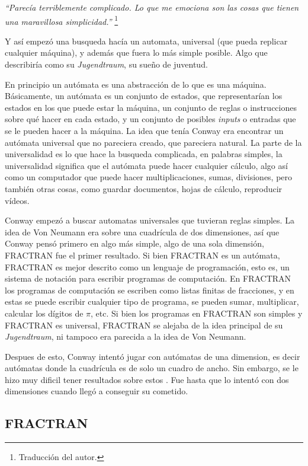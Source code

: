 \textit{``Parec\'ia terriblemente complicado. Lo que me emociona son las cosas que tienen una maravillosa simplicidad.''} \footnote{Traducci\'on del autor.}

Y as\'i empez\'o una busqueda hac\'ia un automata, universal (que pueda replicar cualquier m\'aquina), y adem\'as que fuera lo m\'as simple posible. Algo que describir\'ia como su \textit{Jugendtraum}, su sueño de juventud.

En principio un aut\'omata es una abstracci\'on de lo que es una m\'aquina. B\'asicamente, un aut\'omata es un conjunto de estados, que representar\'ian los estados en los que puede estar la m\'aquina, un conjunto de reglas o instrucciones sobre qu\'e hacer en cada estado, y un conjunto de posibles \textit{inputs} o entradas que se le pueden hacer a la m\'aquina. La idea que ten\'ia Conway era encontrar un aut\'omata universal que no pareciera creado, que pareciera natural. La parte de la universalidad es lo que hace la busqueda complicada, en palabras simples, la universalidad significa que el aut\'omata puede hacer cualquier c\'alculo, algo as\'i como un computador que puede hacer multiplicaciones, sumas, divisiones, pero tambi\'en otras cosas, como guardar documentos, hojas de c\'alculo, reproducir v\'ideos.

Conway empez\'o a buscar automatas universales que tuvieran reglas simples. La idea de Von Neumann era sobre una cuadr\'icula de dos dimensiones, as\'i que Conway pens\'o primero en algo m\'as simple, algo de una sola dimensi\'on, FRACTRAN fue el primer resultado. Si bien FRACTRAN es un aut\'omata, FRACTRAN es mejor descrito como un lenguaje de programaci\'on, esto es, un sistema de notaci\'on para escribir programas de computaci\'on. En FRACTRAN los programas de computaci\'on se escriben como listas finitas de fracciones, y en estas se puede escribir cualquier tipo de programa, se pueden sumar, multiplicar, calcular los d\'igitos de $\pi$, etc. Si bien los programas en FRACTRAN son simples y FRACTRAN es universal, FRACTRAN se alejaba de la idea principal de su \textit{Jugendtraum}, ni tampoco era parecida a la idea de Von Neumann.

Despues de esto, Conway intent\'o jugar con aut\'omatas de una dimension, es decir aut\'omatas donde la cuadr\'icula es de solo un cuadro de ancho. Sin embargo, se le hizo muy dificil tener resultados sobre estos \cite{Roberts2015-ur}. Fue hasta que lo intent\'o con dos dimensiones cuando lleg\'o a conseguir su cometido.

\subsection{FRACTRAN}

